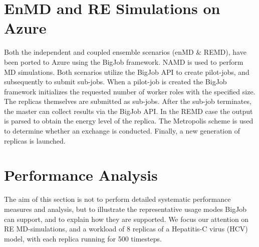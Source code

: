 \documentclass[conference,final]{IEEEtran}
\newcommand{\up}{\vspace*{-1em}}
\newcommand{\numrep}{8 }
\newcommand{\alnote}[1]{ {\textcolor{blue} { ***AL: #1 }}}
\newcommand{\jhanote}[1]{ {\textcolor{red} { ***SJ: #1 }}}
\newcommand{\alnote}[1]{}
\newcommand{\jhanote}[1]{}
\begin{document}
\up
\section{EnMD and RE Simulations on Azure}
\label{sec:enMD-REMD}
\up Both the independent and coupled ensemble scenarios (enMD \&
REMD), have been ported to Azure using the BigJob framework.  NAMD is
used to perform MD simulations.  Both scenarios utilize the BigJob API
to create pilot-jobs, and subsequently to submit sub-jobs. When a
pilot-job is created the BigJob framework initializes the requested
number of worker roles with the specified size. The replicas
themselves are submitted as sub-jobs.  After the sub-job terminates,
the master can collect results via the BigJob API.  In the REMD case
the output is parsed to obtain the energy level of the replica.  The
Metropolis scheme is used to determine whether an exchange is
conducted. Finally, a new generation of replicas is launched.




\up
\section{Performance Analysis}
\label{sec:performance}
\up The aim of this section is not to perform detailed systematic
performance measures and analysis, but to illustrate the
representative usage modes BigJob can support, and to explain how they
are supported.  %
We focus our attention on RE MD-simulations, and a workload of \numrep
replicas of a Hepatitis-C virus (HCV) model, with each replica running
for 500 timesteps.  \up
\end{document}
